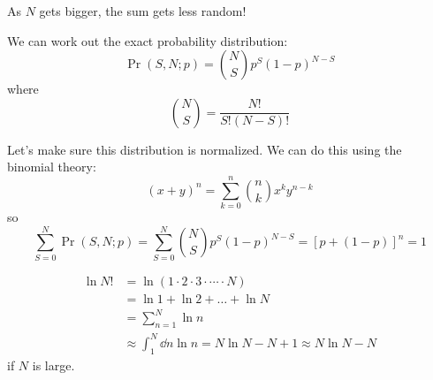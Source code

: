 \documentclass[a4paper,twoside,master.tex]{subfiles}
\begin{document}
As $ N $ gets bigger, the sum gets less random!

We can work out the exact probability distribution:
\begin{equation}\label{eq:binomial_distribution}
    \Pr(S,N;p) = \binom{N}{S} p^S(1-p)^{N-S}\tag{Binomial Distribution}
\end{equation}
where
\begin{equation}
    \binom{N}{S} = \frac{N!}{S!(N-S)!}
\end{equation}

Let's make sure this distribution is normalized. We can do this using the binomial theory:
\begin{equation}
    (x+y)^n = \sum_{k=0}^{n} \binom{n}{k} x^k y^{n-k}
\end{equation}
so
\begin{equation}
    \sum_{S=0}^{N} \Pr(S,N;p) = \sum_{S=0}^{N} \binom{N}{S} p^S(1-p)^{N-S} = \left[ p + (1-p)\right]^n = 1
\end{equation}

\begin{definition}
    \begin{align}
        \ln{N!} &= \ln{(1 \cdot 2 \cdot 3 \cdot \cdots \cdot N)} \\
        &= \ln{1} + \ln{2} + \ldots + \ln{N} \\
        &= \sum_{n=1}^{N} \ln{n} \\
        &\approx \int_{1}^{N} \dd{n} \ln{n} = N \ln{N} - N + 1 \approx N \ln{N} - N
    \end{align}
    if $ N $ is large.
\end{definition}
\end{document}
